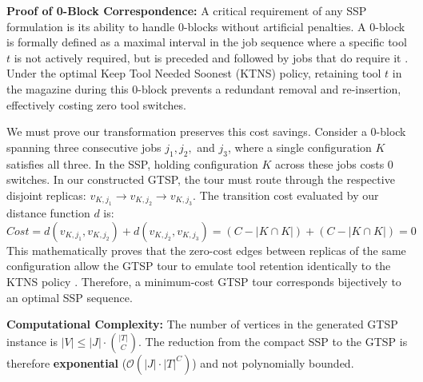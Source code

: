 \documentclass[12pt]{article}
\begin{document}
\textbf{Proof of 0-Block Correspondence:} A critical requirement of any SSP formulation is its ability to handle 0-blocks without artificial penalties. A 0-block is formally defined as a maximal interval in the job sequence where a specific tool $t$ is not actively required, but is preceded and followed by jobs that do require it \parencite{Catanzaro2015, Crama1994}. Under the optimal Keep Tool Needed Soonest (KTNS) policy, retaining tool $t$ in the magazine during this 0-block prevents a redundant removal and re-insertion, effectively costing zero tool switches. 

We must prove our transformation preserves this cost savings. Consider a 0-block spanning three consecutive jobs $j_1, j_2,$ and $j_3$, where a single configuration $K$ satisfies all three. In the SSP, holding configuration $K$ across these jobs costs 0 switches. In our constructed GTSP, the tour must route through the respective disjoint replicas: $v_{K, j_1} \to v_{K, j_2} \to v_{K, j_3}$. The transition cost evaluated by our distance function $d$ is:
\begin{equation}
	Cost = d(v_{K, j_1}, v_{K, j_2}) + d(v_{K, j_2}, v_{K, j_3}) = (C - |K \cap K|) + (C - |K \cap K|) = 0
\end{equation}
This mathematically proves that the zero-cost edges between replicas of the same configuration allow the GTSP tour to emulate tool retention identically to the KTNS policy \parencite{Lien1993}. Therefore, a minimum-cost GTSP tour corresponds bijectively to an optimal SSP sequence.

\textbf{Computational Complexity:} The number of vertices in the generated GTSP instance is $|V| \le |J| \cdot \binom{|T|}{C}$. The reduction from the compact SSP to the GTSP is therefore \textbf{exponential} ($\mathcal{O}(|J| \cdot |T|^C)$) and not polynomially bounded. 
\end{document}

